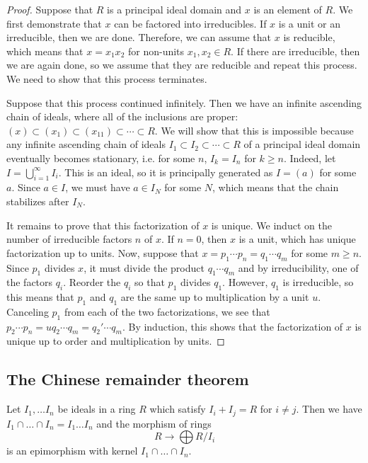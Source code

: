 \begin{proof} 
Suppose that $R$ is a principal ideal domain and $x$ is an element of $R$. We
first demonstrate that $x$ can be factored into irreducibles.
If $x$ is a unit or an irreducible, then we are done. Therefore, we can assume
that $x$ is reducible, which means that $x = x_1 x_2$ for non-units 
$x_1, x_2 \in R$. If there are irreducible, then we are again done, so we
assume that they are reducible and repeat this process. We need to show that
this process terminates.

Suppose that this process continued infinitely. Then we have an infinite
ascending chain of ideals, where all of the inclusions are proper:
$(x) \subset (x_1) \subset (x_{11}) \subset \cdots \subset R$.
We will show that this is impossible because any infinite ascending chain of
ideals $I_1 \subset I_2 \subset \cdots \subset R$ of a principal ideal domain 
eventually becomes stationary, i.e. for some $n$, $I_k = I_n$ for $k \geq n$.
Indeed, let $I = \bigcup_{i=1}^\infty I_i$. This is an ideal, so it is 
principally generated as $I = (a)$ for some $a$. Since $a \in I$, we must have 
$a \in I_N$ for some $N$, which means that the chain stabilizes after $I_N$.

It remains to prove that this factorization of $x$ is unique. We induct on
the number of irreducible factors $n$ of $x$. If $n = 0$, then $x$ is a unit,
which has unique factorization up to units. Now, suppose that 
$x = p_1 \cdots p_n = q_1 \cdots q_m$ for some $m \ge n$. Since $p_1$ divides
$x$, it must divide the product $q_1 \cdots q_m$ and by irreducibility, one of
the factors $q_i$. Reorder the $q_i$ so that $p_1$ divides $q_1$. However,
$q_1$ is irreducible, so this means that $p_1$ and $q_1$ are the same up to
multiplication by a unit $u$. Canceling $p_1$ from each of the two
factorizations, we see that $p_2 \cdots p_n = u q_2 \cdots q_m = q_2' \cdots
q_m$. By induction, this shows that the factorization of $x$ is unique up to
order and multiplication by units.
\end{proof} 

\subsection{The Chinese remainder theorem}

\begin{theorem} Let $I_1, \dots I_n$ be ideals in a
ring $R$ which satisfy $I_i + I_j = R$ for $i \neq j$. Then we have $I_1 \cap
\dots \cap I_n = I_1 \dots I_n$ and the morphism of rings
\[ R \to \bigoplus R/I_i \]
is an epimorphism with kernel $I_1 \cap \dots \cap I_n$.
\end{theorem} 

